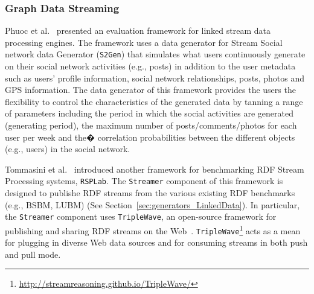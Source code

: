 \subsubsection{Graph Data Streaming}
\label{sec:generators_streaming}

Phuoc et al.~\cite{le2012linked} presented an evaluation framework for linked stream data processing engines. The framework uses a data generator for Stream Social network data Generator (\texttt{S2Gen}) that simulates what users continuously generate on their social network activities (e.g., posts) in addition to the  user metadata such as users' profile information, social network relationships, posts, photos and GPS information. The data generator of this framework provides the users the flexibility to control the characteristics of the generated data by tanning a range of parameters including the period in which the social activities are generated (generating period), the maximum number of posts/comments/photos for each user per week and the� correlation probabilities between the different objects (e.g., users) in the social network. 

Tommasini et al.~\cite{tommasini2017rsplab} introduced another framework for benchmarking RDF Stream Processing systems, \texttt{RSPLab}. The \texttt{Streamer} component of this framework is designed to publishe RDF streams from the various existing RDF benchmarks (e.g., BSBM, LUBM) (See Section~\ref{sec:generators_LinkedData}). In particular, the \texttt{Streamer}  component uses \texttt{TripleWave}, an open-source framework for publishing
and sharing RDF streams on the Web~\cite{mauri2016triplewave}.   \texttt{TripleWave}\footnote{\url{http://streamreasoning.github.io/TripleWave/}} acts as a mean for plugging in diverse Web data sources and for consuming streams in both push and pull mode.
